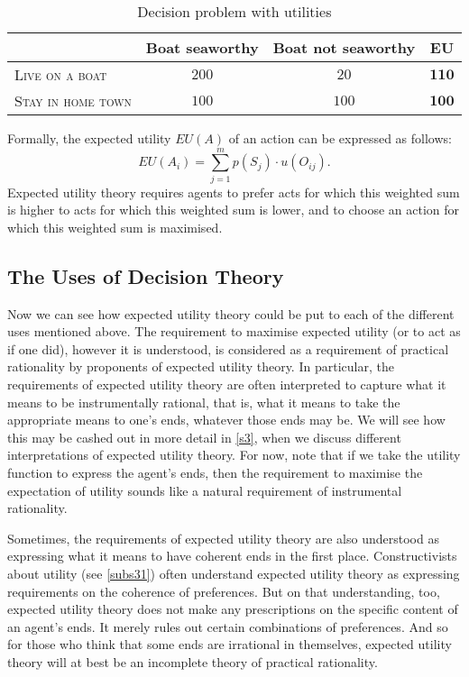 \begin{table}[h]
\centering
\begin{tabular}{llll}
\hline
\multicolumn{1}{l}{} & 
  \multicolumn{1}{c}{Boat seaworthy} & 
  \multicolumn{1}{c}{Boat not seaworthy} & 
  \multicolumn{1}{c}{\textbf{EU}} \\\hline\hline
\multicolumn{1}{l}{\textsc{Live on a boat}} &
  \multicolumn{1}{c}{$200$} &
  \multicolumn{1}{c}{$20$} & 
  \multicolumn{1}{c}{$\boldsymbol{110}$}\\
\multicolumn{1}{l}{\textsc{Stay in home town}} &
  \multicolumn{1}{c}{$100$} &
  \multicolumn{1}{c}{$100$} &
  \multicolumn{1}{c}{$\boldsymbol{100}$}\\
\hline
\end{tabular}
\caption{Decision problem with utilities}
\label{t3}
\end{table}

Formally, the expected utility $EU(A)$ of an action can be expressed as follows:
$$EU(A_{i}) = \sum\limits_{j=1}^m p (S_j) \cdot u (O_{ij}).$$
Expected utility theory requires agents to prefer acts for which this weighted sum is higher to acts for which this weighted sum is lower, and to choose an action for which this weighted sum is maximised.

\subsection{The Uses of Decision Theory}\label{subs13}

Now we can see how expected utility theory could be put to each of the different uses mentioned above. The requirement to maximise expected utility (or to act as if one did), however it is understood, is considered as a requirement of practical rationality by proponents of expected utility theory. In particular, the requirements of expected utility theory are often interpreted to capture what it means to be instrumentally rational, that is, what it means to take the appropriate means to one's ends, whatever those ends may be. We will see how this may be cashed out in more detail in \autoref{s3}, when we discuss different interpretations of expected utility theory. For now, note that if we take the utility function to express the agent's ends, then the requirement to maximise the expectation of utility sounds like a natural requirement of instrumental rationality.

Sometimes, the requirements of expected utility theory are also understood as expressing what it means to have coherent ends in the first place. Constructivists about utility (see \autoref{subs31}) often understand expected utility theory as expressing requirements on the coherence of preferences. But on that understanding, too, expected utility theory does not make any prescriptions on the specific content of an agent's ends. It merely rules out certain combinations of preferences. And so for those who think that some ends are irrational in themselves, expected utility theory will at best be an incomplete theory of practical rationality.


